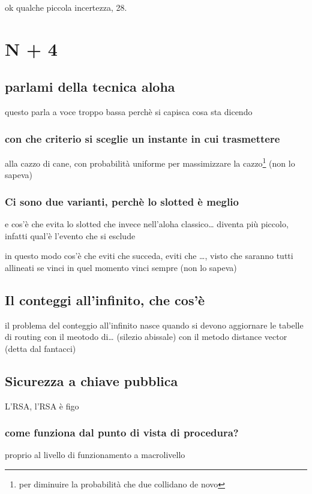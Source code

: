 \documentclass[11pt]{article}
\begin{document}
ok qualche piccola incertezza, 28.

\section{N + 4}
\label{sec:org5155a49}
\subsection{parlami della tecnica aloha}
\label{sec:orga68c27c}
questo parla a voce troppo bassa perchè si capisca cosa sta dicendo
\subsubsection{con che criterio si sceglie un instante in cui trasmettere}
\label{sec:orge5dd143}
alla cazzo di cane, con probabilità uniforme per massimizzare la cazzo\footnote{per diminuire la probabilità che due collidano de novo}
(non lo sapeva)

\subsubsection{Ci sono due varianti, perchè lo slotted è meglio}
\label{sec:org9ea9301}
e cos'è che evita lo slotted che invece nell'aloha classico\ldots{}
diventa più piccolo, infatti qual'è l'evento che si esclude

in questo modo cos'è che eviti che succeda, eviti che \ldots{}, visto che saranno tutti allineati se vinci in quel momento vinci sempre
(non lo sapeva)

\subsection{Il conteggi all'infinito, che cos'è}
\label{sec:org444d64b}
il problema del conteggio all'infinito nasce quando si devono aggiornare le tabelle di routing con il meotodo di\ldots{}
(silezio abissale)
con il metodo distance vector (detta dal fantacci)

\subsection{Sicurezza a chiave pubblica}
\label{sec:org7fde494}
L'RSA, l'RSA è figo
\subsubsection{come funziona dal punto di vista di procedura?}
\label{sec:org96e998a}
proprio al livello di funzionamento a macrolivello
\end{document}
